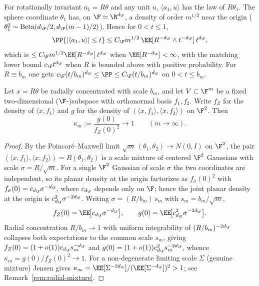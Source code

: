 \begin{lemma}\label{lem:rot-marginal}
For rotationally invariant $a_1=R\theta$ and any unit $u$, $\langle a_1,u\rangle$
has the law of $R\theta_1$.  The sphere coordinate $\theta_1$ has, on
$\F\simeq\R^{d_\F}$, a density of order $m^{1/2}$ near the origin
($\theta_1^2\sim\operatorname{Beta}(d_\F/2,d_\F(m-1)/2)$).  Hence for $0<t\le1$,
\[
  \PP\{|\langle a_1,u\rangle|\le t\}\le C_\F m^{1/2}\,\EE[R^{-d_\F}\wedge t^{-d_\F}]\,t^{d_\F},
\]
which is $\le C_\F m^{1/2}\EE[R^{-d_\F}]\,t^{d_\F}$ when $\EE[R^{-d_\F}]<\infty$, with the
matching lower bound $c_\F t^{d_\F}$ when $R$ is bounded above with positive
probability.  For $R\equiv b_m$ one gets $c_\F(t/b_m)^{d_\F}\le\PP\le C_\F(t/b_m)^{d_\F}$
on $0<t\le b_m$.
\end{lemma}

\begin{lemma}\label{lem:planar}
Let $x=R\theta$ be radially concentrated with scale $b_m$, and let $V\subset\F^m$ be
a fixed two-dimensional ($\F$-)subspace with orthonormal basis $f_1,f_2$.  Write
$f_Z$ for the density of $\langle x,f_1\rangle$ and $g$ for the density of
$(\langle x,f_1\rangle,\langle x,f_2\rangle)$ on $\F^2$.  Then
\[
  \kappa_m:=\frac{g(0)}{f_Z(0)^2}\longrightarrow 1\qquad(m\to\infty).
\]
\end{lemma}

\begin{proof}
By the Poincar\'e--Maxwell limit $\sqrt m\,(\theta_1,\theta_2)\to N(0,I)$ on $\F^2$,
the pair $(\langle x,f_1\rangle,\langle x,f_2\rangle)=R(\theta_1,\theta_2)$ is a scale
mixture of centered $\F^2$ Gaussians with scale $\sigma=R/\sqrt m$.  For a single
$\F^2$ Gaussian of scale $\sigma$ the two coordinates are independent, so its planar
density at the origin factorizes as $f_\sigma(0)^2$ with
$f_\sigma(0)=c_{d_\F}\sigma^{-d_\F}$, where $c_{d_\F}$ depends only on $\F$; hence the
joint planar density at the origin is $c_{d_\F}^2\sigma^{-2d_\F}$.  Writing
$\sigma=(R/b_m)\,s_m$ with $s_m=b_m/\sqrt m$,
\[
  f_Z(0)=\EE\!\big[c_{d_\F}\sigma^{-d_\F}\big],\qquad
  g(0)=\EE\!\big[c_{d_\F}^2\sigma^{-2d_\F}\big].
\]
Radial concentration $R/b_m\to1$ with uniform integrability of $(R/b_m)^{-2d_\F}$
collapses both expectations to the common scale $s_m$, giving
$f_Z(0)=(1+o(1))c_{d_\F}s_m^{-d_\F}$ and $g(0)=(1+o(1))c_{d_\F}^2 s_m^{-2d_\F}$, whence
$\kappa_m=g(0)/f_Z(0)^2\to1$.  For a non-degenerate limiting scale $\Sigma$ (genuine
mixture) Jensen gives $\kappa_\infty=\EE[\Sigma^{-2d_\F}]/(\EE[\Sigma^{-d_\F}])^2>1$;
see Remark~\ref{rem:radial-mixture}.
\end{proof}


